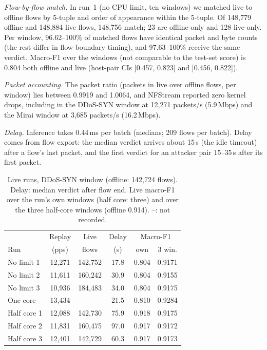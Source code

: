 \emph{Flow-by-flow match.} In run~1 (no CPU limit, ten windows) we matched live to offline flows by 5-tuple and order of appearance within the 5-tuple. Of 148,779 offline and 148,884 live flows, 148,756 match; 23 are offline-only and 128 live-only. Per window, 96.62--100\% of matched flows have identical packet and byte counts (the rest differ in flow-boundary timing), and 97.63--100\% receive the same verdict. Macro-F1 over the windows (not comparable to the test-set score) is 0.804 both offline and live (host-pair CIs [0.457, 0.823] and [0.456, 0.822]).

\emph{Packet accounting.} The packet ratio (packets in live over offline flows, per window) lies between 0.9919 and 1.0064, and NFStream reported zero kernel drops, including in the DDoS-SYN window at 12,271 packets/s (5.9\,Mbps) and the Mirai window at 3,685 packets/s (16.2\,Mbps).

\emph{Delay.} Inference takes 0.44\,ms per batch (medians; 209 flows per batch). Delay comes from flow export: the median verdict arrives about 15\,s (the idle timeout) after a flow's last packet, and the first verdict for an attacker pair 15--35\,s after its first packet.

\begin{table}[t]
\centering
\caption{Live runs, DDoS-SYN window (offline: 142,724 flows). Delay: median verdict after flow end. Live macro-F1 over the run's own windows (half core: three) and over the three half-core windows (offline 0.914). --: not recorded.}
\label{tab:repeats}
\footnotesize
\setlength{\tabcolsep}{2.5pt}
\begin{tabular}{lccccc}
\hline
 & Replay & Live & Delay & \multicolumn{2}{c}{Macro-F1} \\
Run & (pps) & flows & (s) & own & 3 win. \\
\hline
No limit 1 & 12,271 & 142,752 & 17.8 & 0.804 & 0.9171 \\
No limit 2 & 11,611 & 160,242 & 30.9 & 0.804 & 0.9155 \\
No limit 3 & 10,936 & 184,483 & 34.0 & 0.804 & 0.9175 \\
One core   & 13,434 & -- & 21.5 & 0.810 & 0.9284 \\
Half core 1 & 12,088 & 142,730 & 75.9 & 0.918 & 0.9175 \\
Half core 2 & 11,831 & 160,475 & 97.0 & 0.917 & 0.9172 \\
Half core 3 & 12,401 & 142,729 & 60.3 & 0.917 & 0.9173 \\
\hline
\end{tabular}
\end{table}

